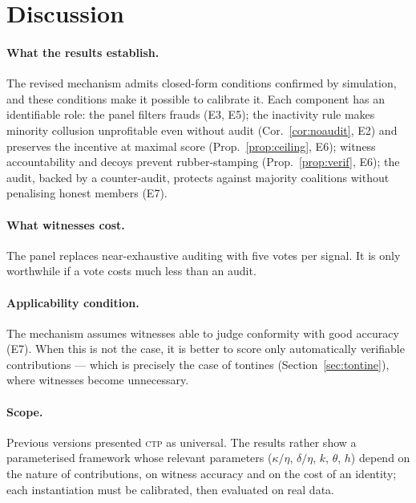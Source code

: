 \documentclass[11pt,a4paper]{article}
\theoremstyle{plain}
\theoremstyle{definition}
\theoremstyle{remark}
\newcommand{\CTP}{\textsc{ctp}}
\newcommand{\1}{\mathbf{1}}
\begin{document}
\section{Discussion}
\label{sec:discussion}

\paragraph{What the results establish.} The revised mechanism admits
closed-form conditions confirmed by simulation, and these conditions make it
possible to calibrate it. Each component has an identifiable role: the panel
filters frauds (E3, E5); the inactivity rule makes minority collusion
unprofitable even without audit (Cor.~\ref{cor:noaudit}, E2) and preserves the
incentive at maximal score (Prop.~\ref{prop:ceiling}, E6); witness
accountability and decoys prevent rubber-stamping (Prop.~\ref{prop:verif}, E6);
the audit, backed by a counter-audit, protects against majority coalitions
without penalising honest members (E7).

\paragraph{What witnesses cost.} The panel replaces near-exhaustive auditing
with five votes per signal. It is only worthwhile if a vote costs much less
than an audit.

\paragraph{Applicability condition.} The mechanism assumes witnesses able to
judge conformity with good accuracy (E7). When this is not the case, it is
better to score only automatically verifiable contributions --- which is
precisely the case of tontines (Section~\ref{sec:tontine}), where witnesses
become unnecessary.

\paragraph{Scope.} Previous versions presented \CTP{} as universal. The results
rather show a parameterised framework whose relevant parameters ($\kappa/\eta$,
$\delta/\eta$, $k$, $\theta$, $h$) depend on the nature of contributions, on
witness accuracy and on the cost of an identity; each instantiation must be
calibrated, then evaluated on real data.
\end{document}

